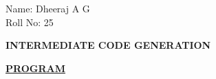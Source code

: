 \documentclass[10pt]{article}
\begin{document}
\noindent
Name: Dheeraj A G\\
Roll No: 25

\vspace{0.15cm}

\noindent
\makebox[\textwidth]{\dotfill}

\vspace{0.05cm}

\begin{center}
    \textbf{INTERMEDIATE CODE GENERATION}
\end{center}

\vspace{0.05cm}

\noindent
\makebox[\textwidth]{\dotfill}

\vspace{0.15cm}

\noindent
\underline{\textbf{PROGRAM}}

\vspace{0.1cm}
\end{document}
